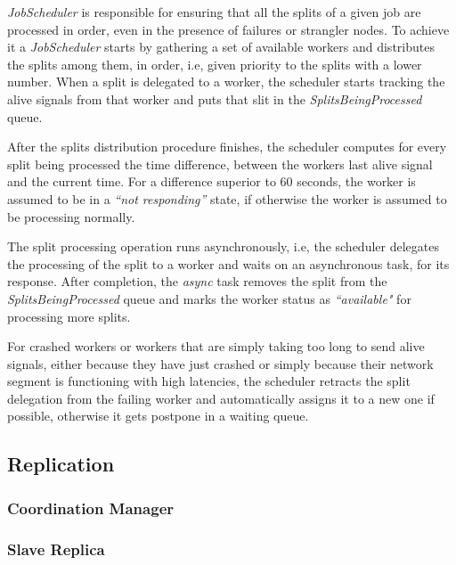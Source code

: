 \documentclass[times, 10pt,twocolumn]{article}
\begin{document}
            \textit{JobScheduler} is responsible for ensuring that all the splits of a given job are processed in order, even in the presence of failures or strangler nodes. To achieve it a \textit{JobScheduler} starts by gathering a set of available workers and distributes the splits among them, in order, i.e, given priority to the splits with a lower number. When a split is delegated to a worker, the scheduler starts tracking the alive signals from that worker and puts that slit in the \textit{SplitsBeingProcessed} queue.

            After the splits distribution procedure finishes, the scheduler computes for every split being processed the time difference, between the workers last alive signal and the current time. For a difference superior to 60 seconds, the worker is assumed to be in a \textit{``not responding''} state, if otherwise the worker is assumed to be processing normally.

            The split processing operation runs asynchronously, i.e, the scheduler delegates the processing of the split to a worker and waits on an asynchronous task, for its response. After completion, the \textit{async} task removes the split from the \textit{SplitsBeingProcessed} queue and marks the worker status as \textit{``available"} for processing more splits.

            For crashed workers or workers that are simply taking too long to send alive signals, either because they have just crashed or simply because their network segment is functioning with high latencies, the scheduler retracts the split delegation from the failing worker and automatically assigns it to a new one if possible, otherwise it gets postpone in a waiting queue.

        \subsection{Replication}

        	\subsubsection{Coordination Manager}

        	\subsubsection{Slave Replica}
\end{document}
